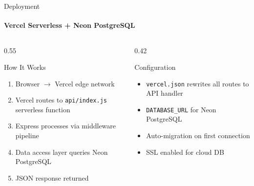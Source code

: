 \documentclass[aspectratio=169, 12pt]{beamer}
\begin{document}
\begin{frame}{Deployment}
\framesubtitle{Vercel Serverless + Neon PostgreSQL}

\begin{columns}[T]
\begin{column}{0.55\textwidth}
\begin{block}{How It Works}
\begin{enumerate}\itemsep=3pt
    \item Browser $\rightarrow$ Vercel edge network
    \item Vercel routes to \texttt{api/index.js} serverless function
    \item Express processes via middleware pipeline
    \item Data access layer queries Neon PostgreSQL
    \item JSON response returned
\end{enumerate}
\end{block}
\end{column}
\begin{column}{0.42\textwidth}
\begin{block}{Configuration}
\begin{itemize}\itemsep=2pt
    \item \texttt{vercel.json} rewrites all routes to API handler
    \item \texttt{DATABASE\_URL} for Neon PostgreSQL
    \item Auto-migration on first connection
    \item SSL enabled for cloud DB
\end{itemize}
\end{block}
\end{column}
\end{columns}
\end{frame}
\end{document}
